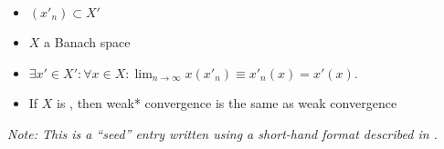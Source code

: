 \documentclass[12pt]{article}
\begin{document}
\begin{itemize} 
\item  $(x'_n)\subset X'$ 
\item  $X$ a Banach space  
\item  $\exists x'\in X':\forall x\in X:\lim_{n\rightarrow \infty} x(x'_n)\equiv x'_n(x)=x'(x)$.  
\item  If $X$ is , then weak* 
convergence is the same as weak convergence 
\end{itemize}
	
{\it Note: This is a ``seed'' entry written using a short-hand format described in .}
\end{document}
